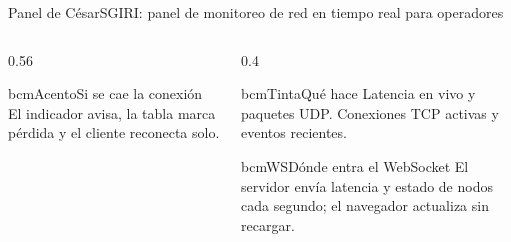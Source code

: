 \begin{frame}{Panel de César}{SGIRI: panel de monitoreo de red en tiempo real para operadores}
  \begin{columns}[T]
    \begin{column}{0.56\textwidth}
      \begin{tarjeta}{bcmAcento}{Si se cae la conexión}
        \footnotesize El indicador avisa, la tabla marca pérdida y el cliente reconecta solo.
      \end{tarjeta}
    \end{column}
    \begin{column}{0.4\textwidth}
      \begin{tarjeta}{bcmTinta}{Qué hace}
        \footnotesize Latencia en vivo y paquetes UDP. Conexiones TCP activas y eventos recientes.
      \end{tarjeta}
      \begin{tarjeta}{bcmWS}{Dónde entra el WebSocket}
        \footnotesize El servidor envía latencia y estado de nodos cada segundo; el navegador actualiza sin recargar.
      \end{tarjeta}
    \end{column}
  \end{columns}
\end{frame}